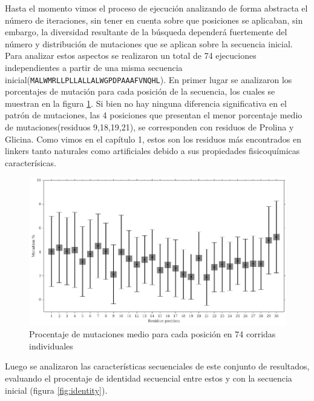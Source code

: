 Hasta el momento vimos el proceso de ejecución analizando de forma abstracta el número de iteraciones, sin tener en cuenta sobre que posiciones se aplicaban,
sin embargo, la diversidad resultante de la búsqueda dependerá fuertemente del número y distribución de mutaciones que se aplican sobre la secuencia inicial.
Para analizar estos aspectos se realizaron un total de 74 ejecuciones independientes a partir de una misma secuencia inicial(\texttt{MALWMRLLPLLALLALWGPDPAAAFVNQHL}).
En primer lugar se analizaron los porcentajes de mutación para cada posición de la secuencia, los cuales se muestran en la figura \ref{fig:mutationPerSite}.
Si bien no hay ninguna diferencia significativa en el patrón de mutaciones, las 4 posiciones que presentan el menor porcentaje medio de mutaciones(residuos 9,18,19,21),
se corresponden con residuos de Prolina y Glicina.
Como vimos en el capítulo 1, estos son los residuos más encontrados en linkers tanto naturales como artificiales debido a sus propiedades fisicoquímicas caracterísicas.

\begin{figure}[htbp]
\includegraphics[width=\textwidth]{img/resultados/mutationsPerPosition.png}
\caption{Procentaje de mutaciones medio para cada posición en 74 corridas individuales}
\label{fig:mutationPerSite}
\end{figure}


Luego se analizaron las características secuenciales de este conjunto de resultados, evaluando el procentaje de identidad secuencial entre estos y con la secuencia inicial (figura \ref{fig:identity}). 




